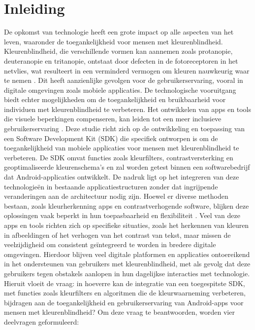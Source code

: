 \section{Inleiding}%
\label{sec:inleiding}
De opkomst van technologie heeft een grote impact op alle aspecten van het leven, waaronder de 
toegankelijkheid voor mensen met kleurenblindheid. Kleurenblindheid, die verschillende vormen kan 
aannemen zoals protanopie, deuteranopie en tritanopie, ontstaat door defecten in de fotoreceptoren 
in het netvlies, wat resulteert in een verminderd vermogen om kleuren nauwkeurig waar te nemen 
\autocite{Salih2020}. Dit heeft aanzienlijke gevolgen voor de gebruikerservaring, vooral in digitale 
omgevingen zoals mobiele applicaties. De technologische vooruitgang biedt echter mogelijkheden om de 
toegankelijkheid en bruikbaarheid voor individuen met kleurenblindheid te verbeteren. Het ontwikkelen 
van apps en tools die visuele beperkingen compenseren, kan leiden tot een meer inclusieve 
gebruikerservaring \autocite{Bandyopadhyay2017}. Deze studie richt zich op de ontwikkeling en toepassing van een Software 
Development Kit (SDK) die specifiek ontworpen is om de toegankelijkheid van mobiele applicaties 
voor mensen met kleurenblindheid te verbeteren. De SDK omvat functies zoals kleurfilters, 
contrastversterking en geoptimaliseerde kleurenschema’s en zal worden getest binnen een 
softwarebedrijf dat Android-applicaties ontwikkelt. De nadruk ligt op het integreren van deze 
technologieën in bestaande applicatiestructuren zonder dat ingrijpende veranderingen aan de 
architectuur nodig zijn. Hoewel er diverse methoden bestaan, zoals kleurherkenning apps en 
contrastverhogende software, blijken deze oplossingen vaak beperkt in hun toepasbaarheid en 
flexibiliteit \autocite{Baswaraju2020}. Veel van deze apps en tools richten zich op specifieke situaties, zoals het herkennen 
van kleuren in afbeeldingen of het verhogen van het contrast van tekst, maar missen de veelzijdigheid 
om consistent geïntegreerd te worden in bredere digitale omgevingen. Hierdoor blijven veel digitale 
platformen en applicaties ontoereikend in het ondersteunen van gebruikers met kleurenblindheid, met 
als gevolg dat deze gebruikers tegen obstakels aanlopen in hun dagelijkse interacties met 
technologie. Hieruit vloeit de vraag: in hoeverre kan de integratie van een toegespitste SDK, met 
functies zoals kleurfilters en algoritmen die de kleurwaarneming verbeteren, bijdragen aan de 
toegankelijkheid en gebruikerservaring van Android-apps voor mensen met kleurenblindheid?
Om deze vraag te beantwoorden, worden vier deelvragen geformuleerd:

